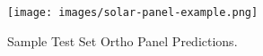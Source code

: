 \begin{figure}[t!]
\centering
\texttt{[image: images/solar-panel-example.png]}
\caption{Sample Test Set Ortho Panel Predictions.}
\label{fig:results}
\end{figure}